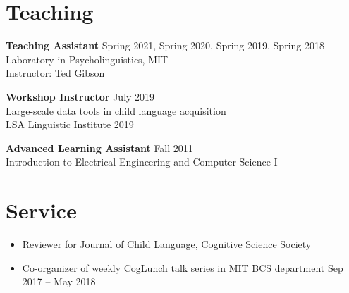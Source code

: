 \documentclass[11pt,]{article}
\providecommand{\tightlist}{%
  \setlength{\itemsep}{0pt}\setlength{\parskip}{0pt}}
\begin{document}
\hypertarget{teaching}{%
\section{Teaching}\label{teaching}}

\textbf{Teaching Assistant} \hfill Spring 2021, Spring 2020, Spring
2019, Spring 2018\\
\hspace*{0.333em}\hspace*{0.333em}\hspace*{0.333em}\hspace*{0.333em}Laboratory
in Psycholinguistics, MIT\\
\hspace*{0.333em}\hspace*{0.333em}\hspace*{0.333em}\hspace*{0.333em}Instructor:
Ted Gibson

\textbf{Workshop Instructor} \hfill July 2019\\
\hspace*{0.333em}\hspace*{0.333em}\hspace*{0.333em}\hspace*{0.333em}Large-scale
data tools in child language acquisition\\
\hspace*{0.333em}\hspace*{0.333em}\hspace*{0.333em}\hspace*{0.333em}LSA
Linguistic Institute 2019

\textbf{Advanced Learning Assistant} \hfill Fall 2011\\
\hspace*{0.333em}\hspace*{0.333em}\hspace*{0.333em}\hspace*{0.333em}Introduction
to Electrical Engineering and Computer Science I

\hypertarget{service}{%
\section{Service}\label{service}}

\begin{itemize}
\tightlist
\item
  Reviewer for Journal of Child Language, Cognitive Science Society
\item
  Co-organizer of weekly CogLunch talk series in MIT BCS department
  \hfill Sep 2017 -- May 2018
\end{itemize}
\end{document}
